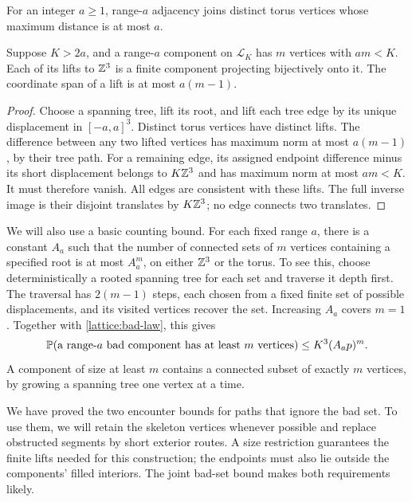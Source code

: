 For an integer $a\ge1$, range-$a$ adjacency joins distinct torus
vertices whose maximum distance is at most $a$.

\begin{lemma}\label{lattice:small-lifts}
Suppose $K>2a$, and a range-$a$ component on $\mathcal L_K$ has
$m$ vertices with $am<K$.  Each of its lifts to $\mathbb Z^3$ is a finite
component projecting bijectively onto it.  The coordinate span of a lift
is at most $a(m-1)$.
\end{lemma}
\begin{proof}
Choose a spanning tree, lift its root, and lift each tree edge by its
unique displacement in $[-a,a]^3$.  Distinct torus vertices have distinct
lifts.  The difference between any two lifted vertices has maximum norm
at most $a(m-1)$, by their tree path.  For a remaining edge, its assigned
endpoint difference minus its short displacement belongs to $K\mathbb Z^3$
and has maximum norm at most $am<K$.  It must therefore vanish.
All edges are consistent with these lifts.  The full inverse image is
their disjoint translates by $K\mathbb Z^3$; no edge connects two translates.
\end{proof}

We will also use a basic counting bound.  For each fixed range $a$, there
is a constant $A_a$ such that the number of connected sets of $m$ vertices
containing a specified root is at most $A_a^m$, on either $\mathbb Z^3$ or the
torus.  To see this, choose deterministically a rooted spanning tree for
each set and traverse it depth first.  The traversal has $2(m-1)$ steps,
each chosen from a fixed finite set of possible displacements, and its
visited vertices recover the set.  Increasing $A_a$ covers $m=1$.
Together with \eqref{lattice:bad-law}, this gives
\begin{equation}\label{lattice:large-animal}
 \mathbb P(\text{a range-$a$ bad component has at least }m\text{ vertices})
       \le K^3(A_ap)^m.
\end{equation}
A component of size at least $m$ contains a connected subset of exactly
$m$ vertices, by growing a spanning tree one vertex at a time.

We have proved the two encounter bounds for paths that ignore the bad
set.  To use them, we will retain the skeleton vertices whenever possible
and replace obstructed segments by short exterior routes.  A size restriction
guarantees the finite lifts needed for this construction; the endpoints
must also lie outside the components' filled interiors.  The joint bad-set
bound makes both requirements likely.

